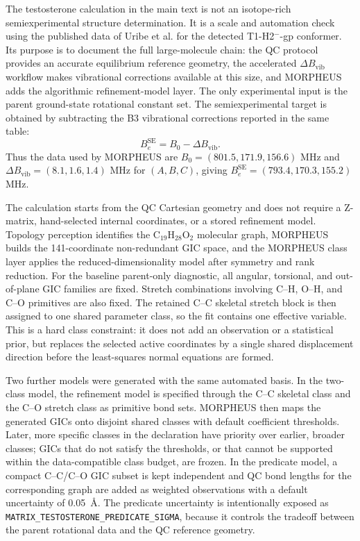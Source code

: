 \documentclass[12pt]{article}
\begin{document}
The testosterone calculation in the main text is not an isotope-rich
semiexperimental structure determination. It is a scale and automation check
using the published data of Uribe et al. for the detected T1-H2$^{-}$-gp
conformer. Its purpose is to document the full large-molecule chain: the
QC protocol provides an accurate equilibrium reference geometry, the
accelerated $\Delta B_\mathrm{vib}$ workflow makes vibrational corrections
	available at this size, and MORPHEUS adds the algorithmic refinement-model layer.
The only experimental input is the parent ground-state rotational constant
set. The semiexperimental target is obtained by subtracting the B3 vibrational
corrections reported in the same table:
\[
B_e^\mathrm{SE}=B_0-\Delta B_\mathrm{vib}.
\]
Thus the data used by MORPHEUS are $B_0=(801.5,171.9,156.6)$ MHz and
$\Delta B_\mathrm{vib}=(8.1,1.6,1.4)$ MHz for $(A,B,C)$, giving
$B_e^\mathrm{SE}=(793.4,170.3,155.2)$ MHz.

The calculation starts from the QC Cartesian geometry and does not require
a Z-matrix, hand-selected internal coordinates, or a stored refinement model.
Topology perception identifies the C$_{19}$H$_{28}$O$_2$ molecular graph,
MORPHEUS builds the 141-coordinate non-redundant GIC space, and the
MORPHEUS class layer applies the reduced-dimensionality model after symmetry
and rank reduction. For the baseline parent-only diagnostic, all angular,
torsional, and out-of-plane GIC families are fixed. Stretch combinations
involving C--H, O--H, and C--O primitives are also fixed. The retained C--C
skeletal stretch block is then assigned to one shared parameter class, so the
fit contains one effective variable. This is a hard class constraint: it does
not add an observation or a statistical prior, but replaces the selected active
coordinates by a single shared displacement direction before the least-squares
normal equations are formed.

Two further models were generated with the same automated basis. In the
two-class model, the refinement model is specified through the C--C skeletal
class and the C--O stretch class as primitive bond sets. MORPHEUS then maps the
generated GICs onto disjoint shared classes with default coefficient
thresholds. Later, more specific classes in the declaration have priority over
earlier, broader classes; GICs that do not satisfy the thresholds, or that
cannot be supported within the data-compatible class budget, are frozen. In the
predicate model, a
compact C--C/C--O GIC subset is kept independent and QC bond lengths for the
corresponding graph are added as weighted observations with a default
uncertainty of 0.05~\AA{}. The predicate uncertainty is intentionally exposed as
\texttt{MATRIX\_TESTOSTERONE\_PREDICATE\_SIGMA}, because it controls the
tradeoff between the parent rotational data and the QC reference geometry.
\end{document}
